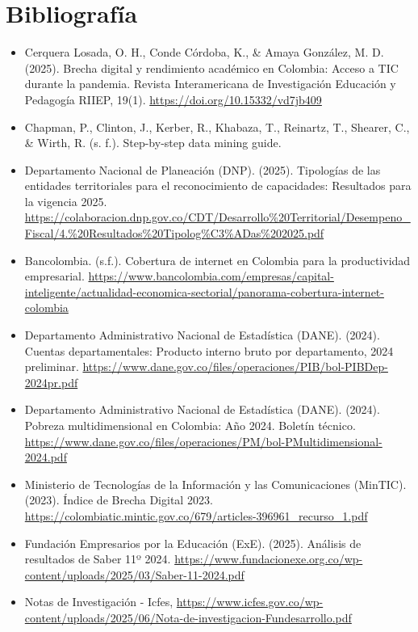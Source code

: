 \section*{Bibliografía}

\begin{itemize}
    \item Cerquera Losada, O. H., Conde Córdoba, K., \& Amaya González, M. D. (2025). Brecha digital y rendimiento académico en Colombia: Acceso a TIC durante la pandemia. Revista Interamericana de Investigación Educación y Pedagogía RIIEP, 19(1). \url{https://doi.org/10.15332/vd7jb409}
    \item Chapman, P., Clinton, J., Kerber, R., Khabaza, T., Reinartz, T., Shearer, C., \& Wirth, R. (s. f.). Step-by-step data mining guide.
    \item Departamento Nacional de Planeación (DNP). (2025). Tipologías de las entidades territoriales para el reconocimiento de capacidades: Resultados para la vigencia 2025. \url{https://colaboracion.dnp.gov.co/CDT/Desarrollo\%20Territorial/Desempeno\_Fiscal/4.\%20Resultados\%20Tipolog\%C3\%ADas\%202025.pdf}
    \item Bancolombia. (s.f.). Cobertura de internet en Colombia para la productividad empresarial. \url{https://www.bancolombia.com/empresas/capital-inteligente/actualidad-economica-sectorial/panorama-cobertura-internet-colombia}
    \item Departamento Administrativo Nacional de Estadística (DANE). (2024). Cuentas departamentales: Producto interno bruto por departamento, 2024 preliminar. \url{https://www.dane.gov.co/files/operaciones/PIB/bol-PIBDep-2024pr.pdf}
    \item Departamento Administrativo Nacional de Estadística (DANE). (2024). Pobreza multidimensional en Colombia: Año 2024. Boletín técnico. \url{https://www.dane.gov.co/files/operaciones/PM/bol-PMultidimensional-2024.pdf}
    \item Ministerio de Tecnologías de la Información y las Comunicaciones (MinTIC). (2023). Índice de Brecha Digital 2023. \url{https://colombiatic.mintic.gov.co/679/articles-396961\_recurso\_1.pdf}
    \item Fundación Empresarios por la Educación (ExE). (2025). Análisis de resultados de Saber 11º 2024. \url{https://www.fundacionexe.org.co/wp-content/uploads/2025/03/Saber-11-2024.pdf}
    \item Notas de Investigación - Icfes, \url{https://www.icfes.gov.co/wp-content/uploads/2025/06/Nota-de-investigacion-Fundesarrollo.pdf}

\end{itemize}

